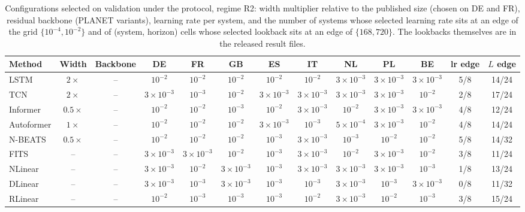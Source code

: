 \begin{table}[!t]
\centering
\caption{Configurations selected on validation under the protocol, regime R2: width multiplier relative to the published size (chosen on DE and FR), residual backbone (PLANET variants), learning rate per system, and the number of systems whose selected learning rate sits at an edge of the grid $\{10^{-4},10^{-2}\}$ and of (system, horizon) cells whose selected lookback sits at an edge of $\{168,720\}$. The lookbacks themselves are in the released result files.}
\label{tab:config-v2}
\setlength{\tabcolsep}{3pt}\footnotesize
\begin{adjustbox}{max width=\linewidth}
\begin{tabular}{lcccccccccccc}
\toprule
Method & Width & Backbone & DE & FR & GB & ES & IT & NL & PL & BE & lr edge & $L$ edge \\
\midrule
LSTM & $2\times$ & -- & $10^{-2}$ & $10^{-2}$ & $10^{-2}$ & $10^{-2}$ & $10^{-2}$ & $3\times10^{-3}$ & $3\times10^{-3}$ & $3\times10^{-3}$ & 5/8 & 14/24 \\
TCN & $2\times$ & -- & $3\times10^{-3}$ & $10^{-3}$ & $10^{-2}$ & $3\times10^{-3}$ & $3\times10^{-3}$ & $3\times10^{-3}$ & $3\times10^{-3}$ & $10^{-2}$ & 2/8 & 17/24 \\
Informer & $0.5\times$ & -- & $10^{-2}$ & $10^{-2}$ & $10^{-3}$ & $10^{-2}$ & $3\times10^{-3}$ & $10^{-2}$ & $3\times10^{-3}$ & $3\times10^{-3}$ & 4/8 & 12/24 \\
Autoformer & $1\times$ & -- & $10^{-2}$ & $10^{-2}$ & $10^{-2}$ & $3\times10^{-3}$ & $10^{-3}$ & $5\times10^{-4}$ & $3\times10^{-3}$ & $10^{-2}$ & 4/8 & 14/24 \\
N-BEATS & $0.5\times$ & -- & $10^{-2}$ & $10^{-2}$ & $10^{-2}$ & $10^{-3}$ & $3\times10^{-3}$ & $10^{-3}$ & $10^{-2}$ & $10^{-2}$ & 5/8 & 14/32 \\
FITS & -- & -- & $3\times10^{-3}$ & $3\times10^{-3}$ & $10^{-2}$ & $10^{-3}$ & $3\times10^{-3}$ & $10^{-2}$ & $3\times10^{-3}$ & $10^{-2}$ & 3/8 & 11/24 \\
NLinear & -- & -- & $3\times10^{-3}$ & $10^{-2}$ & $3\times10^{-3}$ & $10^{-3}$ & $3\times10^{-3}$ & $3\times10^{-3}$ & $3\times10^{-3}$ & $10^{-3}$ & 1/8 & 13/24 \\
DLinear & -- & -- & $3\times10^{-3}$ & $10^{-3}$ & $3\times10^{-3}$ & $10^{-3}$ & $10^{-3}$ & $3\times10^{-3}$ & $10^{-3}$ & $3\times10^{-3}$ & 0/8 & 11/32 \\
RLinear & -- & -- & $10^{-2}$ & $10^{-3}$ & $10^{-3}$ & $10^{-3}$ & $10^{-2}$ & $3\times10^{-3}$ & $10^{-2}$ & $10^{-3}$ & 3/8 & 15/24 \\

\end{tabular}
\end{adjustbox}
\end{table}
